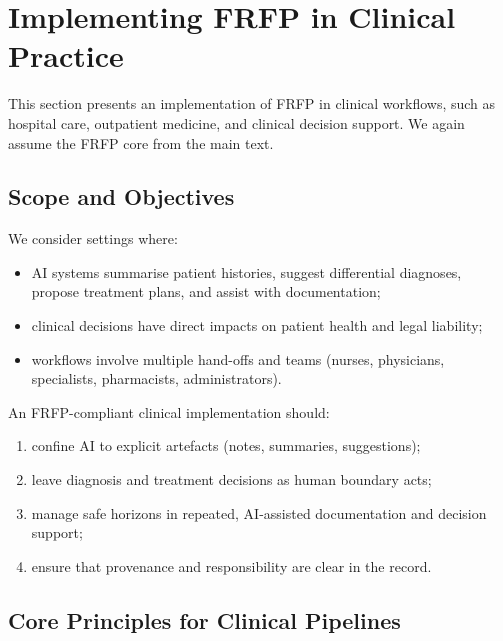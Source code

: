 
\section{Implementing FRFP in Clinical Practice}
\label{sec:frfp-clinical}

This section presents an implementation of FRFP in clinical workflows,
such as hospital care, outpatient medicine, and clinical decision support.
We again assume the FRFP core from the main text.

\subsection{Scope and Objectives}

We consider settings where:

\begin{itemize}
  \item AI systems summarise patient histories, suggest differential
        diagnoses, propose treatment plans, and assist with documentation;
  \item clinical decisions have direct impacts on patient health and legal
        liability;
  \item workflows involve multiple hand-offs and teams (nurses, physicians,
        specialists, pharmacists, administrators).
\end{itemize}

An FRFP-compliant clinical implementation should:

\begin{enumerate}
  \item confine AI to explicit artefacts (notes, summaries, suggestions);
  \item leave diagnosis and treatment decisions as human boundary acts;
  \item manage safe horizons in repeated, AI-assisted documentation and
        decision support;
  \item ensure that provenance and responsibility are clear in the record.
\end{enumerate}

\subsection{Core Principles for Clinical Pipelines}

